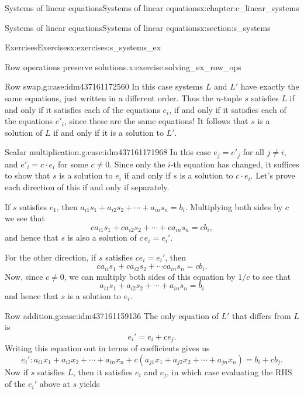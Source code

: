 \documentclass[oneside,10pt,]{book}
\numberwithin{equation}{section}
\begin{document}
\begin{chapterptx}{Systems of linear equations}{}{Systems of linear equations}{}{}{x:chapter:c_linear_systems}
\begin{sectionptx}{Systems of linear equations}{}{Systems of linear equations}{}{}{x:section:s_systems}
\begin{exercises-subsection-numberless}{Exercises}{}{Exercises}{}{}{x:exercises:s_systems_ex}
\begin{divisionexercise}{2}{Row operations preserve solutions.}{}{x:exercise:solving_ex_row_ops}
\begin{case}{}{Row swap.}{g:case:idm437161172560}
In this case systems \(L\) and \(L'\) have exactly the same equations, just written in a different order. Thus the \(n\)-tuple \(s\) satisfies \(L\) if and only if it satisfies each of the equations \(e_i\), if and only if it satisfies each of the equations \(e'_i\), since these are the same equations! It follows that \(s\) is a solution of \(L\) if and only if it is a solution to \(L'\).%
\end{case}
\begin{case}{}{Scalar multiplication.}{g:case:idm437161171968}
In this case \(e_j=e'_j\) for all \(j\ne i\), and \(e'_i=c\cdot e_i\) for some \(c\ne 0\). Since only the \(i\)-th equation has changed, it suffices to show that \(s\) is a solution to \(e_i\) if and only if \(s\) is a solution to \(c\cdot e_i\). Let's prove each direction of this if and only if separately.%
\par
If \(s\) satisfies \(e_1\), then \(a_{i1}s_1+a_{i2}s_2+\cdots +a_{in}s_n=b_i\). Multiplying both sides by \(c\) we see that%
\begin{equation*}
ca_{i1}s_1+ca_{i2}s_2+\cdots +ca_{in}s_n=cb_i,
\end{equation*}
and hence that \(s\) is also a solution of \(c\,e_i=e_i'\).%
\par
For the other direction, if \(s\) satisfies \(c e_i=e_i'\), then%
\begin{equation*}
ca_{ii}s_1+ca_{i2}s_2+\cdots ca_{in}s_n=cb_i.
\end{equation*}
Now, since \(c\ne 0\), we can multiply both sides of this equation by \(1/c\) to see that%
\begin{equation*}
a_{i1}s_1+a_{i2}s_2+\cdots +a_{in}s_n=b_i
\end{equation*}
and hence that \(s\) is a solution to \(e_i\).%
\end{case}
\begin{case}{}{Row addition.}{g:case:idm437161159136}
The only equation of \(L'\) that differs from \(L\) is%
\begin{equation*}
e_i'=e_i+ce_j\text{.}
\end{equation*}
Writing this equation out in terms of coefficients gives us%
\begin{equation*}
e_i': a_{i1}x_1+a_{i2}x_2+\cdots +a_{in}x_n+c(a_{j1}x_1+a_{j2}x_2+\cdots +a_{jn}x_n)=b_i+cb_j\text{.}
\end{equation*}
Now if \(s\) satisfies \(L\), then it satisfies \(e_i\) and \(e_j\), in which case evaluating the RHS of the \(e_i'\) above at \(s\) yields%
\begin{align*}

\end{align*}
\end{case}
\end{divisionexercise}
\end{exercises-subsection-numberless}
\end{sectionptx}
\end{chapterptx}
\end{document}
